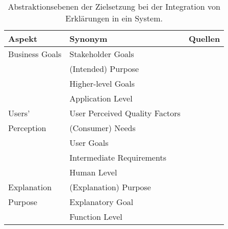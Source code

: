 \begin{table}[htb!]
    \begin{center}
        \begin{tabular}{|p{}|p{}|p{}|}
            \hline
            \textbf{Aspekt}     & \textbf{Synonym} & \textbf{Quellen} \\ \hline
            Business Goals      & Stakeholder Goals & \cite{nunes_systematic_2017} \\
                                & (Intended) Purpose & \cite{waa_evaluating_2021} \\
                                & Higher-level Goals & \cite{nunes_systematic_2017} \\
                                & Application Level & \cite{sokol_explainability_2020} \\
            \hline
            Users'              & User Perceived Quality Factors & \cite{nunes_systematic_2017} \\
            Perception          & (Consumer) Needs & \cite{ehsan_human-centered_2020} \cite{chazette_end-users_nodate} \\
                                & User Goals & \cite{ehsan_human-centered_2020} \\
                                & Intermediate Requirements & \cite{waa_evaluating_2021} \\
                                & Human Level & \cite{sokol_explainability_2020} \\
            \hline
            Explanation         & (Explanation) Purpose & \cite{nunes_systematic_2017} \\
            Purpose             & Explanatory Goal & \cite{tintarev_designing_nodate} \cite{balog_measuring_2020} \\
                                & Function Level & \cite{sokol_explainability_2020} \\
            \hline
        \end{tabular}
    \end{center}
    \caption{Abstraktionsebenen der Zielsetzung bei der Integration von Erklärungen in ein System.}
    \label{tab:impact_of_objective_on_explanation}
\end{table}

